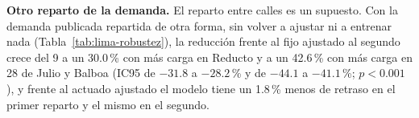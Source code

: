 \noindent\textbf{Otro reparto de la demanda.} El reparto entre calles es
un supuesto. Con la demanda publicada repartida de otra forma, sin
volver a ajustar ni a entrenar nada (Tabla~\ref{tab:lima-robustez}), la
reducción frente al fijo ajustado al segundo crece del 9 a un 30.0\,\%
con más carga en Reducto y a un 42.6\,\% con más carga en 28 de Julio y
Balboa (IC95 de $-31.8$ a $-28.2$\,\% y de $-44.1$ a $-41.1$\,\%;
$p < 0.001$), y frente al actuado ajustado el modelo tiene un 1.8\,\%
menos de retraso en el primer reparto y el mismo en el segundo.

\begin{table}[!tbp]
\centering
\footnotesize
\setlength{\tabcolsep}{3pt}

\caption[Caso Lima, el nudo: otro reparto de la demanda]{Caso Lima, el nudo: retraso total por vehículo (s/veh) de cada control y de los dos modelos con el mismo total de 4271~veh/h repartido de otra forma entre las entradas, y cambio del modelo de orden fijo frente a cada control. Ningún control se volvió a ajustar ni a entrenar. En la segunda fila, las dos entradas de Reducto llevan un 20\,\% más y las otras dos un 20\,\% menos, antes de reescalar al mismo total; en la tercera, al revés. 100 semillas.}
\label{tab:lima-robustez}
\end{table}

